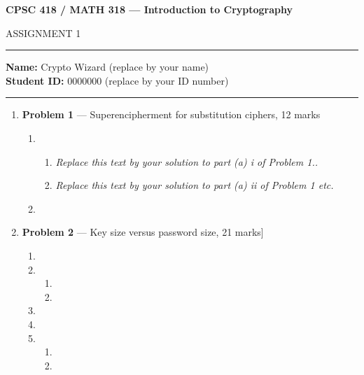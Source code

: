 \documentclass[11pt]{article}
\theoremstyle{definition}
\begin{document}
\begin{center}
{\bf \Large CPSC 418 / MATH 318 --- Introduction to Cryptography

ASSIGNMENT 1 %
}
\end{center}

\hrule 	

\textbf{Name:} Crypto Wizard (replace by your name) \\
\textbf{Student ID:} 0000000 (replace by your ID number)

\medskip \hrule

\begin{enumerate}

\item[] \textbf{Problem 1} --- Superencipherment for substitution ciphers, 12 marks

\begin{enumerate}
\item
\begin{enumerate}
\item \emph{Replace this text by your solution to part (a) i of Problem 1..}

\item \emph{Replace this text by your solution to part (a) ii of Problem 1 etc.}
\end{enumerate}

\item
\end{enumerate}


\item[] \textbf{Problem 2} --- Key size versus password size, 21 marks]



\begin{enumerate}
\item
\item

\begin{enumerate}
\item
\item
\end{enumerate}

\item

\item

\item
\begin{enumerate}
\item

\item
\end{enumerate}
\end{enumerate}




\end{enumerate}
\end{document}
